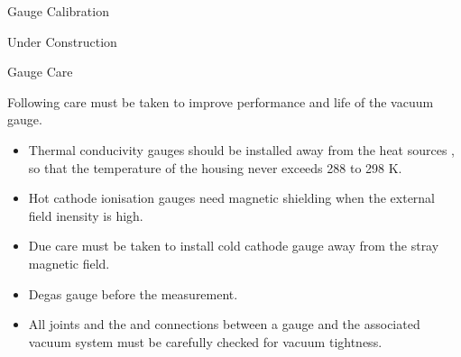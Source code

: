 \documentclass[11pt]{beamer}
\begin{document}
\begin{frame}{Gauge Calibration}


\begin{block}{} 
       \begin{center}
			Under Construction
		\end{center} 	


\end {block}


\end{frame}





\begin{frame}{Gauge Care}


Following care must be taken to improve performance and life of the vacuum gauge.



 \begin{itemize}
          \item Thermal conducivity gauges should be installed away from the heat sources , so that the temperature of the housing never exceeds 288 to 298 K.
          \item Hot cathode ionisation gauges need magnetic shielding when the external field inensity is high.
          \item Due care must be taken to install cold cathode gauge away from the stray magnetic field.
               
          \item Degas gauge before the measurement.
          \item All joints and the and connections between a gauge and the associated vacuum system must be carefully checked for vacuum tightness.
        \end{itemize}





\end{frame}
\end{document}

